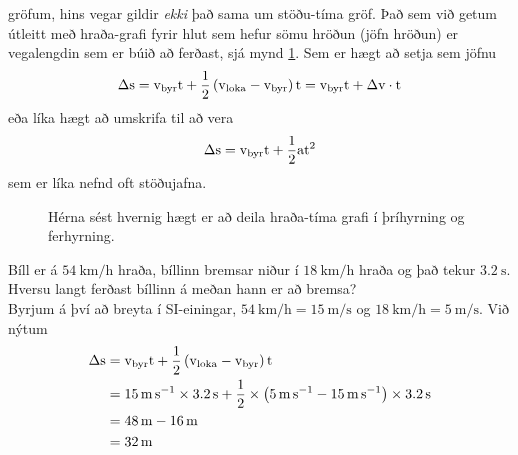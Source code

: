gröfum, hins vegar gildir \emph{ekki} það sama um stöðu-tíma gröf. Það sem við 
getum útleitt með hraða-grafi fyrir hlut sem hefur sömu hröðun (jöfn
hröðun) er vegalengdin sem er búið að ferðast, 
sjá mynd \ref{motion1d:fig:speedtimeconstaccle}. Sem er hægt að
setja sem jöfnu
\begin{equation}
	\Delta \textrm{s} = \textrm{v}_\text{byr} \textrm{t} 
		+ \frac{1}{2} \left(\textrm{v}_\text{loka} - \textrm{v}_\text{byr} \right) \textrm{t}
		= \textrm{v}_\text{byr} \textrm{t} + \Delta \textrm{v} \cdot \textrm{t}
\end{equation}
eða líka hægt að umskrifa til að vera
\begin{equation} \label{motion1d:eqn:constacceletime}
	\Delta \textrm{s} = \textrm{v}_\text{byr} \textrm{t} 
		+ \frac{1}{2} \textrm{a} \textrm{t}^2
\end{equation}
sem er líka nefnd oft stöðujafna. 
\begin{figure}[!ht]
	\centering
	\caption{Hérna sést hvernig hægt er að deila hraða-tíma grafi í þríhyrning
		og ferhyrning.}
	\label{motion1d:fig:speedtimeconstaccle}
\end{figure}
%
\begin{formalexample}
Bíll er á $\SI{54}{\km\per\hour}$ 
hraða, bíllinn bremsar niður í  $\SI{18}{\km\per\hour}$
hraða og það tekur $\SI{3.2}{\s}$. 
Hversu langt ferðast bíllinn á meðan hann er að bremsa?
\\[4 ex]
Byrjum á því að breyta í SI-einingar, 
$\SI{54}{\km\per\hour} = \SI{15}{\m\per\s}$
og $\SI{18}{\km\per\hour} = \SI{5}{\m\per\s}$. 
Við nýtum
\begin{align*}
	\Delta\ulengths & =  \uspeed_\text{byr} \utime 
			+ \frac{1}{2} \left(\uspeed_\text{loka} - \uspeed_\text{byr} \right) \utime
			\\
		& = \SI{15}{\m\per\s} \times \SI{3.2}{\s}
			+ \frac{1}{2} \times
				\left(
					\SI{5}{\m\per\s} - \SI{15}{\m\per\s} 
				\right) \times \SI{3.2}{\s}
			\\
		& = \SI{48}{\m} - \SI{16}{\m} \\
		& = \SI{32}{\m}
\end{align*}
\end{formalexample}
